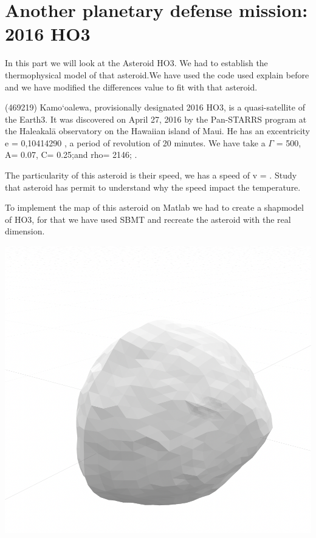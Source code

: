 \section{Another planetary defense mission: 2016 HO3}
\label{HO3}

In this part we will look at the Asteroid HO3. We had to establish the thermophysical model of that asteroid.We have used the code used explain before and we have modified the differences value to fit with that asteroid.\newline

(469219) Kamo‘oalewa, provisionally designated 2016 HO3, is a quasi-satellite of the Earth3. It was discovered on April 27, 2016 by the Pan-STARRS program at the Haleakalā observatory on the Hawaiian island of Maui.\newline
He has an excentricity e = 0,10414290 , a period of revolution of 20 minutes. We have take a $\Gamma$ = 500, A= 0.07, C= 0.25;and rho= 2146; .\newline

The particularity of this asteroid is their speed, we has a speed of v = . Study that asteroid has permit to understand why the speed impact the temperature.

To implement the map of this asteroid on Matlab we had to create a shapmodel of HO3, for that we have used SBMT and recreate the asteroid with the real dimension.\newline 
\begin{center}
    \captionsetup{type=figure}
    \includegraphics[scale=0.4]{rsc/HO3_shapemodel.png}
\end{center}

